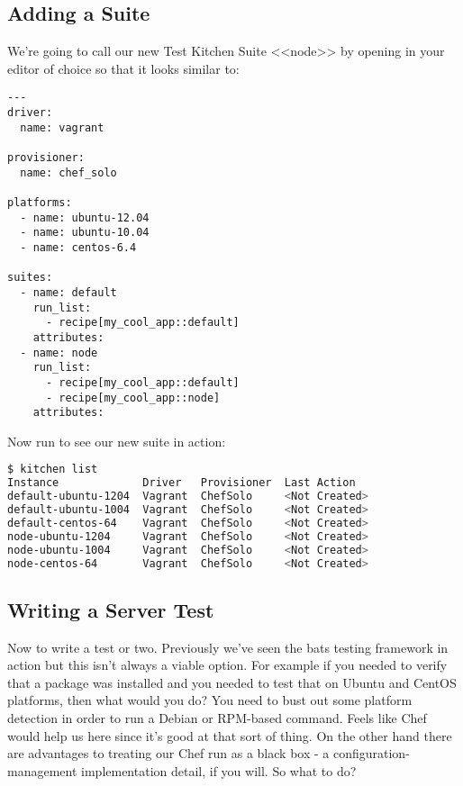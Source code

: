 \subsection{Adding a Suite}

We're going to call our new Test Kitchen Suite <<node>> by opening  in your editor of choice so that it looks similar to:

\begin{lstlisting}[label=lst:testing-test-kitchen34]
---
driver:
  name: vagrant

provisioner:
  name: chef_solo

platforms:
  - name: ubuntu-12.04
  - name: ubuntu-10.04
  - name: centos-6.4

suites:
  - name: default
    run_list:
      - recipe[my_cool_app::default]
    attributes:
  - name: node
    run_list:
      - recipe[my_cool_app::default]
      - recipe[my_cool_app::node]
    attributes:
\end{lstlisting}

Now run  to see our new suite in action:

\begin{lstlisting}[language=Bash,label=lst:testing-test-kitchen35]
$ kitchen list
Instance             Driver   Provisioner  Last Action
default-ubuntu-1204  Vagrant  ChefSolo     <Not Created>
default-ubuntu-1004  Vagrant  ChefSolo     <Not Created>
default-centos-64    Vagrant  ChefSolo     <Not Created>
node-ubuntu-1204     Vagrant  ChefSolo     <Not Created>
node-ubuntu-1004     Vagrant  ChefSolo     <Not Created>
node-centos-64       Vagrant  ChefSolo     <Not Created>
\end{lstlisting}



\subsection{Writing a Server Test}

Now to write a test or two. Previously we've seen the bats testing framework in action but this isn't always a viable option. For example if you needed to verify that a package was installed and you needed to test that on Ubuntu and CentOS platforms, then what would you do? You need to bust out some platform detection in order to run a Debian or RPM-based command. Feels like Chef would help us here since it's good at that sort of thing. On the other hand there are advantages to treating our Chef run as a black box - a configuration-management implementation detail, if you will. So what to do?

